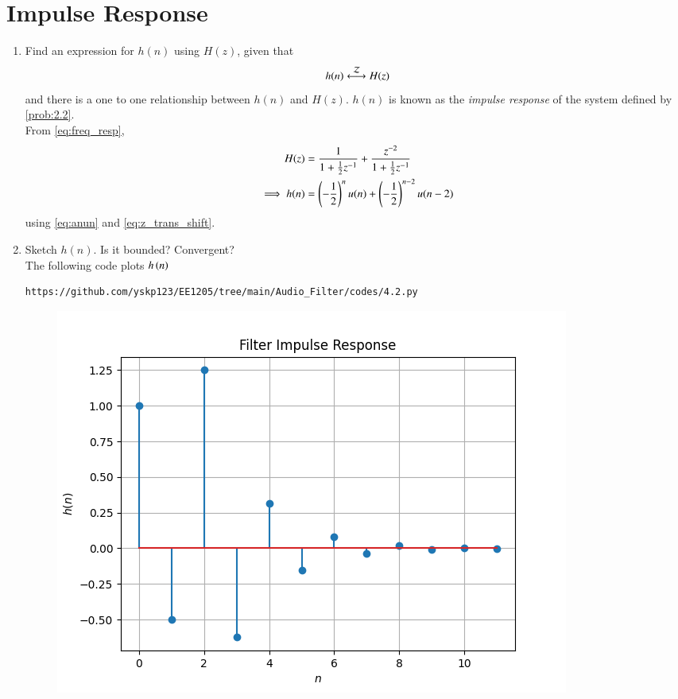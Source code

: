 \documentclass[journal,12pt,twocolumn]{IEEEtran}
\theoremstyle{remark}
\begin{document}
\section{Impulse Response}
\begin{enumerate}[label=\thesection.\arabic*]
\item \label{prob:impulse_resp}
Find an expression for $h(n)$ using $H(z)$, given that 
\begin{equation}
\label{eq:impulse_resp}
h(n) \system{Z} H(z)
\end{equation}
and there is a one to one relationship between $h(n)$ and $H(z)$. $h(n)$ is known as the {\em impulse response} of the
system defined by \eqref{prob:2.2}.
\\
\solution From \eqref{eq:freq_resp},
\begin{align}
H(z) &= \frac{1}{1 + \frac{1}{2}z^{-1}} + \frac{ z^{-2}}{1 + \frac{1}{2}z^{-1}}
\\
\implies h(n) &= \left(-\frac{1}{2}\right)^{n}u(n) + \left(-\frac{1}{2}\right)^{n-2}u(n-2)
\end{align}
using \eqref{eq:anun} and \eqref{eq:z_trans_shift}.
\item Sketch $h(n)$. Is it bounded? Convergent? 
\\
\solution The following code plots $h\left(n\right)$ 
\begin{lstlisting}
https://github.com/yskp123/EE1205/tree/main/Audio_Filter/codes/4.2.py
\end{lstlisting}
\begin{figure}[H]
\centering
\includegraphics[width=\columnwidth]{figs/hn}

\end{figure}
\end{enumerate}
\end{document}
